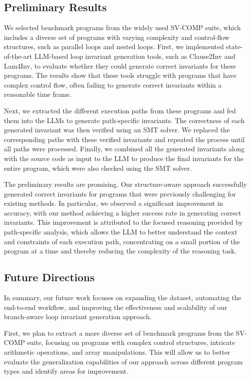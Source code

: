 \documentclass[letterpaper]{article} %
\begin{document}
\subsection{Preliminary Results}

We selected benchmark programs from the widely used SV-COMP suite, which includes a diverse set of programs with varying complexity and control-flow structures, such as parallel loops and nested loops. First, we implemented state-of-the-art LLM-based loop invariant generation tools, such as Clause2Inv and Lam4Inv, to evaluate whether they could generate correct invariants for these programs. The results show that these tools struggle with programs that have complex control flow, often failing to generate correct invariants within a reasonable time frame.

Next, we extracted the different execution paths from these programs and fed them into the LLMs to generate path-specific invariants. The correctness of each generated invariant was then verified using an SMT solver. We replaced the corresponding paths with these verified invariants and repeated the process until all paths were processed. Finally, we combined all the generated invariants along with the source code as input to the LLM to produce the final invariants for the entire program, which were also checked using the SMT solver.

The preliminary results are promising. Our structure-aware approach successfully generated correct invariants for programs that were previously challenging for existing methods. In particular, we observed a significant improvement in accuracy, with our method achieving a higher success rate in generating correct invariants. This improvement is attributed to the focused reasoning provided by path-specific analysis, which allows the LLM to better understand the context and constraints of each execution path, concentrating on a small portion of the program at a time and thereby reducing the complexity of the reasoning task.

\subsection{Future Directions}

In summary, our future work focuses on expanding the dataset, automating the end-to-end workflow, and improving the effectiveness and scalability of our branch-aware loop invariant generation approach.

First, we plan to extract a more diverse set of benchmark programs from the SV-COMP suite, focusing on programs with complex control structures, intricate arithmetic operations, and array manipulations. This will allow us to better evaluate the generalization capabilities of our approach across different program types and identify areas for improvement.
\end{document}
